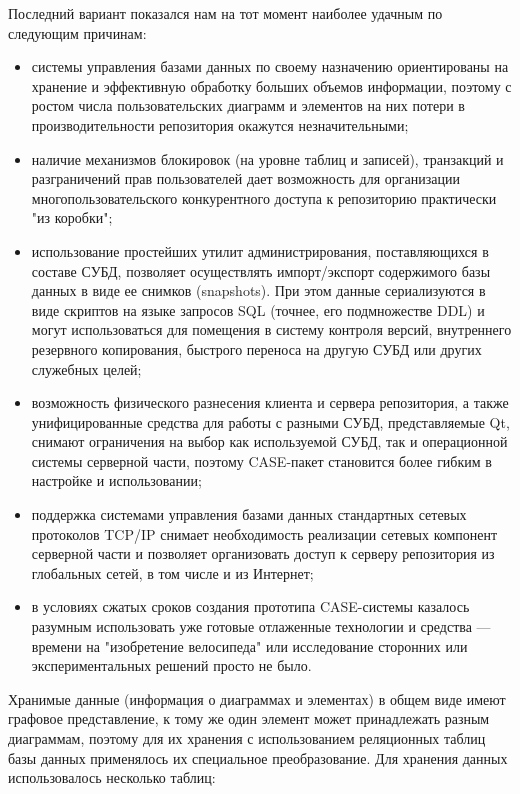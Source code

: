 \documentclass[a5paper]{article}
\begin{document}
Последний вариант показался нам на тот момент наиболее удачным по
следующим причинам:

\begin{itemize}
  \item системы управления базами данных по своему назначению ориентированы на
        хранение и эффективную обработку больших объемов информации, поэтому с
        ростом числа пользовательских диаграмм и элементов на них потери в
        производительности репозитория окажутся незначительными;
  \item наличие механизмов блокировок (на уровне таблиц и записей), транзакций и
        разграничений прав пользователей дает возможность для организации
        многопользовательского конкурентного доступа к репозиторию практически
        "из коробки";
  \item использование простейших утилит администрирования, поставляющихся в
        составе СУБД, позволяет осуществлять импорт/экспорт содержимого базы
        данных в виде ее снимков (snapshots). При
        этом данные сериализуются в виде скриптов на языке запросов
        SQL (точнее, его подмножестве DDL) и могут использоваться для помещения в
        систему контроля версий, внутреннего резервного копирования, быстрого
        переноса на другую СУБД или других служебных целей;
  \item возможность физического разнесения клиента и сервера репозитория, а
        также унифицированные средства для работы с разными СУБД,
        представляемые Qt, снимают
        ограничения на выбор как используемой СУБД, так и операционной системы
        серверной части, поэтому CASE-пакет
        становится более гибким в настройке и использовании;
  \item поддержка системами управления базами данных стандартных сетевых
        протоколов TCP/IP снимает необходимость реализации сетевых компонент серверной части и
        позволяет организовать доступ к серверу репозитория из глобальных
        сетей, в том числе и из Интернет;
  \item в условиях сжатых сроков создания прототипа
        CASE-системы казалось разумным использовать уже готовые отлаженные технологии и средства
        --- времени на "изобретение велосипеда" или исследование сторонних или
        экспериментальных решений просто не было.
\end{itemize}

Хранимые данные (информация о диаграммах и элементах) в общем виде имеют
графовое представление, к тому же один элемент может принадлежать
разным диаграммам, поэтому для их хранения с использованием реляционных
таблиц базы данных применялось их специальное преобразование. Для
хранения данных использовалось несколько таблиц:
\end{document}
